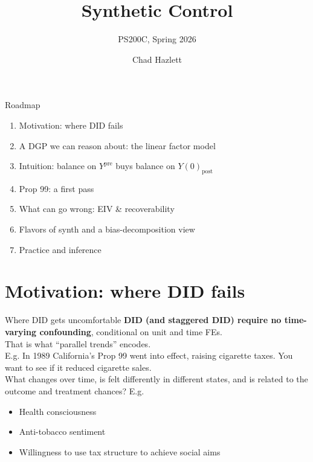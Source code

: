 \documentclass[handout,xcolor=dvipsnames,pdftex,hyperref={colorlinks=false}]{beamer}
\title[Synthetic Control]{Synthetic Control}
\subtitle[ ]{PS200C, Spring 2026}
\author[Hazlett]{Chad Hazlett}
\institute[UCLA]{UCLA\\[1ex]\texttt{chazlett@ucla.edu}}
\date{}
\newcommand\makegaps{\addtolength{\itemsep}{.25\baselineskip}}
\newcommand{\Ypre}{Y^{\text{pre}}}        %
\begin{document}
\subject{Talks}

\begin{frame}
  \titlepage
\end{frame}

\begin{frame}{Roadmap}
\begin{enumerate}\makegaps
  \item Motivation: where DID fails
  \item A DGP we can reason about: the linear factor model
  \item Intuition: balance on $\Ypre$ buys balance on $Y(0)_{\text{post}}$
  \item Prop 99: a first pass
  \item What can go wrong: EIV \& recoverability
  \item Flavors of synth and a bias-decomposition view
  \item Practice and inference
\end{enumerate}
\end{frame}

\section{Motivation: where DID fails}

\begin{frame}{Where DID gets uncomfortable}
\textbf{DID (and staggered DID) require no time-varying confounding}, conditional on unit and time FEs.\\[1ex]
That is what ``parallel trends'' encodes.\\[2ex]
 E.g. In 1989 California's Prop 99 went into effect, raising cigarette taxes. You want to see if it reduced cigarette sales. \\[1ex]
 What changes over time, is felt differently in different states, and is related to the outcome and treatment chances? E.g.
\begin{itemize}\makegaps
  \item Health consciousness
  \item Anti-tobacco sentiment
  \item Willingness to use tax structure to achieve social aims
\end{itemize}
\end{frame}
\end{document}
